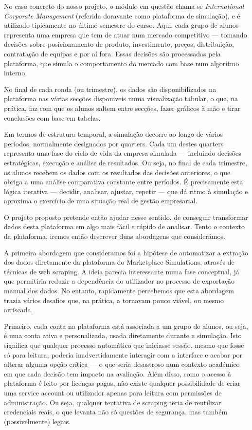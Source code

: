 No caso concreto do nosso projeto, o módulo em questão chama-se \textit{International Corporate Management} (referida doravante como plataforma de simulação), e é utilizado tipicamente no último semestre do curso. Aqui, cada grupo de alunos representa uma empresa que tem de atuar num mercado competitivo — tomando decisões sobre posicionamento de produto, investimento, preços, distribuição, contratação de equipas e por aí fora. Essas decisões são processadas pela plataforma, que simula o comportamento do mercado com base num algoritmo interno. 

No final de cada ronda (ou trimestre), os dados são disponibilizados na plataforma nas várias secções disponiveis numa visualização tabular, o que, na prática, faz com que os alunos saltem entre secções, fazer gráficos à mão e tirar conclusões com base em tabelas.

Em termos de estrutura temporal, a simulação decorre ao longo de vários períodos, normalmente designados por quarters. Cada um destes quarters representa uma fase do ciclo de vida da empresa simulada — incluindo decisões estratégicas, execução e análise de resultados. Ou seja, no final de cada trimestre, os alunos recebem os dados com os resultados das decisões anteriores, o que obriga a uma análise comparativa constante entre períodos. É precisamente esta lógica iterativa — decidir, analisar, ajustar, repetir — que dá ritmo à simulação e aproxima o exercício de uma situação real de gestão empresarial.

O projeto proposto pretende então ajudar nesse sentido, de conseguir transformar dados desta plataforma em algo mais fácil e rápido de analisar. Tento o contexto da plataforma, iremos então descrever duas abordagens que considerámos.

A primeira abordagem que consideramos foi a hipótese de automatizar a extração dos dados diretamente da plataforma do Marketplace Simulations, através de técnicas de web scraping. A ideia parecia interessante numa fase conceptual, já que permitiria reduzir a dependência do utilizador no processo de exportação manual dos dados. No entanto, rapidamente percebemos que esta abordagem trazia vários desafios que, na prática, a tornavam pouco viável, ou mesmo arriscada.

Primeiro, cada conta na plataforma está associada a um grupo de alunos, ou seja, é uma conta ativa e personalizada, usada diretamente durante a simulação. Isto significa que qualquer processo automático que iniciasse sessão, mesmo que fosse só para leitura, poderia inadvertidamente interagir com a interface e acabar por alterar alguma opção crítica — o que seria desastroso num contexto académico em que cada decisão tem impacto na avaliação. Além disso, como o acesso à plataforma é feito por licenças pagas, não existe qualquer possibilidade de criar uma service account ou utilizador apenas para leitura com permissões de administração. Ou seja, qualquer tentativa de scraping teria de reutilizar credenciais reais, o que levanta não só questões de segurança, mas também (possivelmente) legais.  

